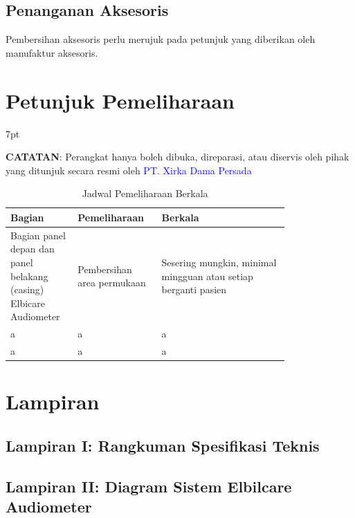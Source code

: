 \documentclass[11pt,a4paper,twoside,draft,onecolumn]{book}
\newenvironment{formalblue}{%
	\def\FrameCommand{%
		\hspace{1pt}%
		{\color{blue}\vrule width 2pt}%
		{\color{formalshade}\vrule width 4pt}%
		\colorbox{formalshade}%
	}%
	\MakeFramed{\advance\hsize-\width\FrameRestore}%
	\noindent\hspace{-4.55pt}%
	\begin{adjustwidth}{}{7pt}%
		\vspace{2pt}\vspace{2pt}%
	}
	{%
		\vspace{2pt}\end{adjustwidth}\endMakeFramed%
}
\begin{document}
		\section{Penanganan Aksesoris}
		Pembersihan aksesoris perlu merujuk pada petunjuk yang diberikan oleh manufaktur aksesoris.
	\newpage
	
	\chapter{Petunjuk Pemeliharaan}
	\begin{formalblue}
		 \textbf{CATATAN}:
		Perangkat hanya boleh dibuka, direparasi, atau diservis oleh pihak yang ditunjuk secara resmi oleh \textcolor{blue}{PT. Xirka Dama Persada} 
	\end{formalblue}

	\begin{table}
		\centering
		\caption{Jadwal Pemeliharaan Berkala}
		\label{tab:7.2}
		\begin{tabular}{|p{0.2\linewidth}  | p{0.2\linewidth}| p{0.4\linewidth}|}
			\hline
			Bagian & Pemeliharaan & Berkala\\
			\hline
			\hline
			Bagian panel depan dan panel belakang (casing) Elbicare Audiometer & Pembersihan area permukaan & Sesering mungkin, minimal mingguan atau setiap berganti pasien\\
			\hline
			a & a & a\\
			\hline
			a & a & a\\
			\hline

		\end{tabular}
	\end{table}

	\newpage
	
	\chapter{Lampiran}
		\section{Lampiran I: Rangkuman Spesifikasi Teknis}
		\section{Lampiran II: Diagram Sistem Elbilcare Audiometer}
	\newpage
	
	
	
\end{document}
